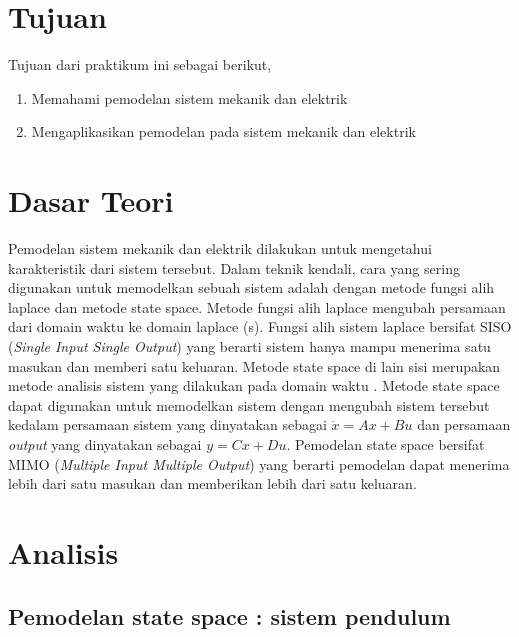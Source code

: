 \documentclass[../cover.tex]{subfiles}
\begin{document}
\section{Tujuan}
    Tujuan dari praktikum ini sebagai berikut,
    \begin{enumerate}
        \item Memahami pemodelan sistem mekanik dan elektrik
        \item Mengaplikasikan pemodelan pada sistem mekanik dan elektrik
    \end{enumerate}

\section{Dasar Teori}
    Pemodelan sistem mekanik dan elektrik dilakukan untuk mengetahui karakteristik dari sistem tersebut. Dalam teknik kendali, cara yang sering digunakan untuk memodelkan sebuah sistem adalah dengan metode fungsi alih laplace dan metode state space. Metode fungsi alih laplace mengubah persamaan dari domain waktu ke domain laplace (s). Fungsi alih sistem laplace bersifat SISO (\textit{Single Input Single Output}) yang berarti sistem hanya mampu menerima satu masukan dan memberi satu keluaran. Metode state space di lain sisi merupakan metode analisis sistem yang dilakukan pada domain waktu \cite{Pal}. Metode state space dapat digunakan untuk  memodelkan sistem dengan mengubah sistem tersebut kedalam persamaan sistem yang dinyatakan sebagai $\dot{x} = Ax + Bu$ dan persamaan \textit{output} yang dinyatakan sebagai $y = Cx + Du$. Pemodelan state space bersifat MIMO (\textit{Multiple Input Multiple Output}) yang berarti pemodelan dapat menerima lebih dari satu masukan dan memberikan lebih dari satu keluaran.
    
\section{Analisis}
    \subsection{Pemodelan state space : sistem pendulum}
\end{document}
